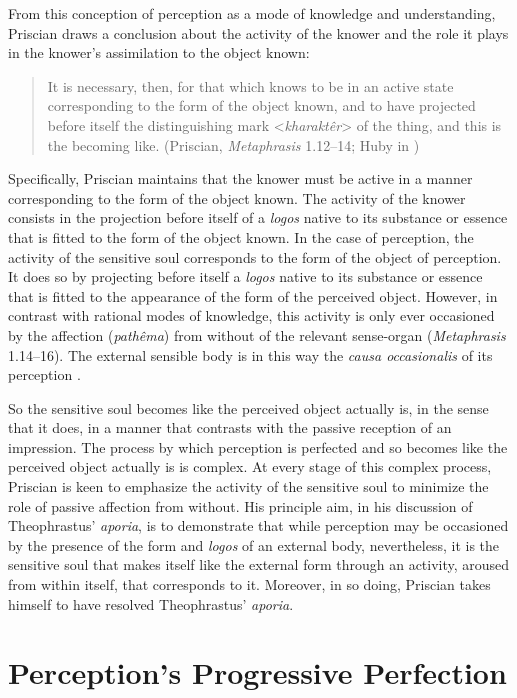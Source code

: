 \documentclass[12pt]{article}
\begin{document}
From this conception of perception as a mode of knowledge and understanding, Priscian draws a conclusion about the activity of the knower and the role it plays in the knower's assimilation to the object known: 
\begin{quote}
	It is necessary, then, for that which knows to be in an active state corresponding to the form of the object known, and to have projected before itself the distinguishing mark <\emph{kharaktêr}> of the thing, and this is the becoming like. (Priscian, \emph{Metaphrasis} 1.12--14; Huby in \citealt[9]{Sorabji:1997ly})
\end{quote}
Specifically, Priscian maintains that the knower must be active in a manner corresponding to the form of the object known. The activity of the knower consists in the projection before itself of a \emph{logos} native to its substance or essence that is fitted to the form of the object known. In the case of perception, the activity of the sensitive soul corresponds to the form of the object of perception. It does so by projecting before itself a \emph{logos} native to its substance or essence that is fitted to the appearance of the form of the perceived object. However, in contrast with rational modes of knowledge, this activity is only ever occasioned by the affection (\emph{pathêma}) from without of the relevant sense-organ (\emph{Metaphrasis} 1.14--16). The external sensible body is in this way the \emph{causa occasionalis} of its perception \citep[112]{Lautner:1994cs}.

So the sensitive soul becomes like the perceived object actually is, in the sense that it does, in a manner that contrasts with the passive reception of an impression. The process by which perception is perfected and so becomes like the perceived object actually is is complex. At every stage of this complex process, Priscian is keen to emphasize the activity of the sensitive soul to minimize the role of passive affection from without. His principle aim, in his discussion of Theophrastus' \emph{aporia}, is to demonstrate that while perception may be occasioned by the presence of the form and \emph{logos} of an external body, nevertheless, it is the sensitive soul that makes itself like the external form through an activity, aroused from within itself, that corresponds to it. Moreover, in so doing, Priscian takes himself to have resolved Theophrastus' \emph{aporia}.


\section{Perception's Progressive Perfection} %
\label{sec:perception_s_formal_assimilation}
\end{document}
